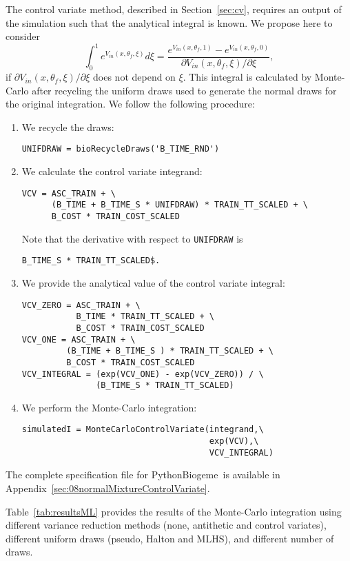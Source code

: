 \documentclass[12pt,a4paper]{article}
\newcommand{\PBIOGEME}{PythonBiogeme}
\begin{document}
The control variate method, described in Section~\ref{sec:cv},
requires an output of the simulation such that the analytical integral
is known. We propose here to consider
\begin{equation}
\int_0^1 e^{V_{in}(x,\theta_f,\xi)} d\xi =
\frac{e^{V_{in}(x,\theta_f,1)}-e^{V_{in}(x,\theta_f,0)}}{\partial V_{in}(x,\theta_f,\xi)/\partial
  \xi},
\end{equation}
if $\partial V_{in}(x,\theta_f,\xi)/\partial \xi$ does not depend on
$\xi$. This integral is calculated by Monte-Carlo after recycling the uniform
draws used to generate the normal draws for the original
integration. We follow the following procedure:
\begin{enumerate}
\item We recycle the draws:
\begin{lstlisting}
UNIFDRAW = bioRecycleDraws('B_TIME_RND')
\end{lstlisting}
\item We calculate the control variate integrand:
\begin{lstlisting}
VCV = ASC_TRAIN + \
      (B_TIME + B_TIME_S * UNIFDRAW) * TRAIN_TT_SCALED + \
      B_COST * TRAIN_COST_SCALED
\end{lstlisting}
Note that the derivative with respect to \lstinline$UNIFDRAW$ is
\begin{lstlisting}
B_TIME_S * TRAIN_TT_SCALED$.
\end{lstlisting}
\item We provide the analytical value of the control variate integral:
\begin{lstlisting}
VCV_ZERO = ASC_TRAIN + \
           B_TIME * TRAIN_TT_SCALED + \
           B_COST * TRAIN_COST_SCALED
VCV_ONE = ASC_TRAIN + \
         (B_TIME + B_TIME_S ) * TRAIN_TT_SCALED + \
         B_COST * TRAIN_COST_SCALED
VCV_INTEGRAL = (exp(VCV_ONE) - exp(VCV_ZERO)) / \
               (B_TIME_S * TRAIN_TT_SCALED)
\end{lstlisting}
\item We perform the Monte-Carlo integration:
\begin{lstlisting}
simulatedI = MonteCarloControlVariate(integrand,\
                                      exp(VCV),\
                                      VCV_INTEGRAL)
\end{lstlisting}
\end{enumerate}
The complete specification file for \PBIOGEME\ is available in
Appendix~\ref{sec:08normalMixtureControlVariate}.

Table~\ref{tab:resultsML} provides the results of the Monte-Carlo
integration using different variance reduction methods (none,
antithetic and control variates), different uniform draws (pseudo,
Halton and MLHS), and different number of draws. 
\end{document}
